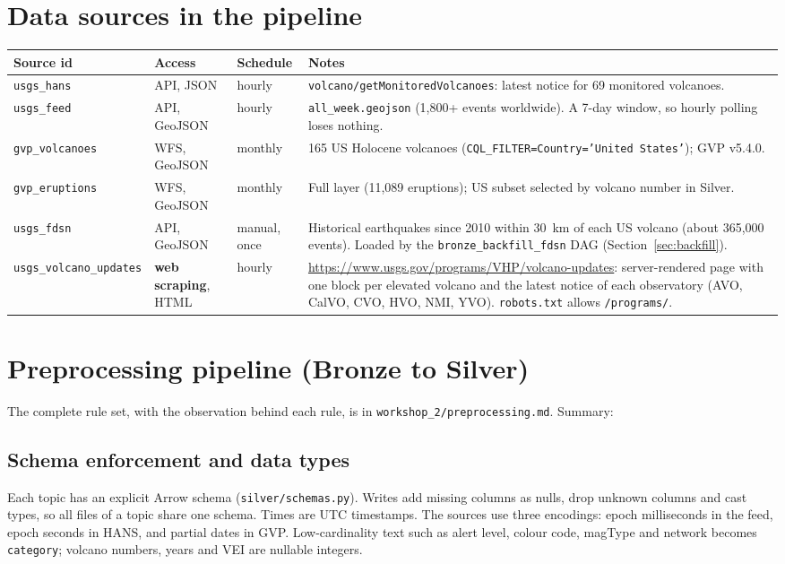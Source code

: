 \documentclass[11pt,a4paper]{article}
\begin{document}
\section{Data sources in the pipeline}

\begin{longtable}{L{3.2cm}L{2.3cm}L{2.0cm}L{6.8cm}}
\toprule
\textbf{Source id} & \textbf{Access} & \textbf{Schedule} & \textbf{Notes}\\
\midrule
\endhead
\texttt{usgs\_hans} & API, JSON & hourly & \texttt{volcano/getMonitoredVolcanoes}: latest notice for 69 monitored volcanoes.\\
\texttt{usgs\_feed} & API, GeoJSON & hourly & \texttt{all\_week.geojson} (1,800+ events worldwide). A 7-day window, so hourly polling loses nothing.\\
\texttt{gvp\_volcanoes} & WFS, GeoJSON & monthly & 165 US Holocene volcanoes (\texttt{CQL\_FILTER=Country='United States'}); GVP v5.4.0.\\
\texttt{gvp\_eruptions} & WFS, GeoJSON & monthly & Full layer (11,089 eruptions); US subset selected by volcano number in Silver.\\
\texttt{usgs\_fdsn} & API, GeoJSON & manual, once & Historical earthquakes since 2010 within 30~km of each US volcano (about 365,000 events). Loaded by the \texttt{bronze\_backfill\_fdsn} DAG (Section~\ref{sec:backfill}).\\
\texttt{usgs\_volcano\_updates} & \textbf{web scraping}, HTML & hourly & \url{https://www.usgs.gov/programs/VHP/volcano-updates}: server-rendered page with one block per elevated volcano and the latest notice of each observatory (AVO, CalVO, CVO, HVO, NMI, YVO). \texttt{robots.txt} allows \texttt{/programs/}.\\
\bottomrule
\end{longtable}

\section{Preprocessing pipeline (Bronze to Silver)}\label{sec:prep}

The complete rule set, with the observation behind each rule, is in \texttt{workshop\_2/preprocessing.md}. Summary:

\subsection{Schema enforcement and data types}
Each topic has an explicit Arrow schema (\texttt{silver/schemas.py}). Writes add missing columns as nulls, drop unknown columns and cast types, so all files of a topic share one schema. Times are UTC timestamps. The sources use three encodings: epoch milliseconds in the feed, epoch seconds in HANS, and partial dates in GVP. Low-cardinality text such as alert level, colour code, magType and network becomes \texttt{category}; volcano numbers, years and VEI are nullable integers.
\end{document}
